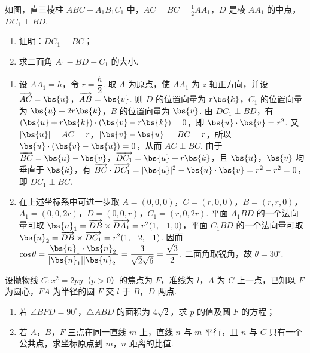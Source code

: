 \begin{problem}
如图，直三棱柱 \(ABC - A_{1}B_{1}C_{1}\) 中，\(AC = BC = \frac{1}{2} AA_{1}\)，\(D\) 是棱 \(AA_{1}\) 的中点，\(DC_{1} \perp BD\).

\begin{enumerate}
\item 证明：\(DC_{1} \perp BC\)；
\item 求二面角 \(A_{1} - BD - C_{1}\) 的大小.
\end{enumerate}
\end{problem}

\begin{solution}
\begin{enumerate}
\item 设 \(AA_1=h\)，令 \(r=\dfrac h2\). 取 \(A\) 为原点，使 \(AA_1\) 为 \(z\) 轴正方向，并设 \(\overrightarrow{AC}=\bs{u}\)，\(\overrightarrow{AB}=\bs{v}\). 则 \(D\) 的位置向量为 \(r\bs{k}\)，\(C_1\) 的位置向量为 \(\bs{u}+2r\bs{k}\)，\(B\) 的位置向量为 \(\bs{v}\). 由 \(DC_1\perp BD\)，有 \((\bs{u}+r\bs{k})\cdot(\bs{v}-r\bs{k})=0\)，即 \(\bs{u}\cdot\bs{v}=r^2\). 又 \(|\bs{u}|=AC=r\)，\(|\bs{v}-\bs{u}|=BC=r\)，所以 \(\bs{u}\cdot(\bs{v}-\bs{u})=0\)，从而 \(AC\perp BC\). 由于 \(\overrightarrow{BC}=\bs{u}-\bs{v}\)，\(\overrightarrow{DC_1}=\bs{u}+r\bs{k}\)，且 \(\bs{u}\)，\(\bs{v}\) 均垂直于 \(\bs{k}\)，有 \(\overrightarrow{BC}\cdot\overrightarrow{DC_1}=|\bs{u}|^2-\bs{u}\cdot\bs{v}=r^2-r^2=0\)，即 \(DC_1\perp BC\).
\item 在上述坐标系中可进一步取 \(A=(0,0,0)\)，\(C=(r,0,0)\)，\(B=(r,r,0)\)，\(A_1=(0,0,2r)\)，\(D=(0,0,r)\)，\(C_1=(r,0,2r)\). 平面 \(A_1BD\) 的一个法向量可取 \(\bs{n}_1=\overrightarrow{DB}\times\overrightarrow{DA_1}=r^2(1,-1,0)\)，平面 \(C_1BD\) 的一个法向量可取 \(\bs{n}_2=\overrightarrow{DB}\times\overrightarrow{DC_1}=r^2(1,-2,-1)\). 因而
\(\cos\theta=\dfrac{\bs{n}_1\cdot\bs{n}_2}{|\bs{n}_1||\bs{n}_2|}=\dfrac{3}{\sqrt2\sqrt6}=\dfrac{\sqrt3}{2}\). 二面角取锐角，故 \(\theta=30^\circ\).
\end{enumerate}
\end{solution}

\begin{problem}
设抛物线 \(C: x^{2} = 2py\)（\(p > 0\)）的焦点为 \(F\)，准线为 \(l\)，\(A\) 为 \(C\) 上一点，已知以 \(F\) 为圆心，\(FA\) 为半径的圆 \(F\) 交 \(l\) 于 \(B\)，\(D\) 两点.

\begin{enumerate}
\item 若 \(\angle BFD = 90^{\circ}\)，\(\triangle ABD\) 的面积为 \(4\sqrt{2}\)，求 \(p\) 的值及圆 \(F\) 的方程；
\item 若 \(A\)，\(B\)，\(F\) 三点在同一直线 \(m\) 上，直线 \(n\) 与 \(m\) 平行，且 \(n\) 与 \(C\) 只有一个公共点，求坐标原点到 \(m\)，\(n\) 距离的比值.
\end{enumerate}
\end{problem}

